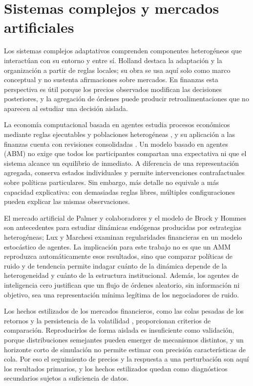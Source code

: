 \section{Sistemas complejos y mercados artificiales}

Los sistemas complejos adaptativos comprenden componentes heterogéneos que interactúan con su entorno y entre sí. Holland \cite{holland1995hidden} destaca la adaptación y la organización a partir de reglas locales; su obra se usa aquí solo como marco conceptual y no sustenta afirmaciones sobre mercados. En finanzas esta perspectiva es útil porque los precios observados modifican las decisiones posteriores, y la agregación de órdenes puede producir retroalimentaciones que no aparecen al estudiar una decisión aislada.

La economía computacional basada en agentes estudia procesos económicos mediante reglas ejecutables y poblaciones heterogéneas \cite{tesfatsion2003agent}, y su aplicación a las finanzas cuenta con revisiones consolidadas \cite{lebaron2006agent,hommes2006heterogeneous,axtell2025agent}. Un modelo basado en agentes (ABM) no exige que todos los participantes compartan una expectativa ni que el sistema alcance un equilibrio de inmediato. A diferencia de una representación agregada, conserva estados individuales y permite intervenciones contrafactuales sobre políticas particulares. Sin embargo, más detalle no equivale a más capacidad explicativa: con demasiadas reglas libres, múltiples configuraciones pueden explicar las mismas observaciones.

El mercado artificial de Palmer y colaboradores \cite{palmer1994artificial} y el modelo de Brock y Hommes \cite{brock1998heterogeneous} son antecedentes para estudiar dinámicas endógenas producidas por estrategias heterogéneas; Lux y Marchesi \cite{lux1999scaling} examinan regularidades financieras en un modelo estocástico de agentes. La implicación para este trabajo no es que un AMM reproduzca automáticamente esos resultados, sino que comparar políticas de ruido y de tendencia permite indagar cuánto de la dinámica depende de la heterogeneidad y cuánto de la estructura institucional. Además, los agentes de inteligencia cero \cite{gode1993allocative,farmer2005predictive} justifican que un flujo de órdenes aleatorio, sin información ni objetivo, sea una representación mínima legítima de los negociadores de ruido.

Los hechos estilizados de los mercados financieros, como las colas pesadas de los retornos y la persistencia de la volatilidad \cite{cont2001empirical}, proporcionan criterios de comparación. Reproducirlos de forma aislada es insuficiente como validación, porque distribuciones semejantes pueden emerger de mecanismos distintos, y un horizonte corto de simulación no permite estimar con precisión características de cola. Por eso el seguimiento de precios y la respuesta a una perturbación son aquí los resultados primarios, y los hechos estilizados quedan como diagnósticos secundarios sujetos a suficiencia de datos.

